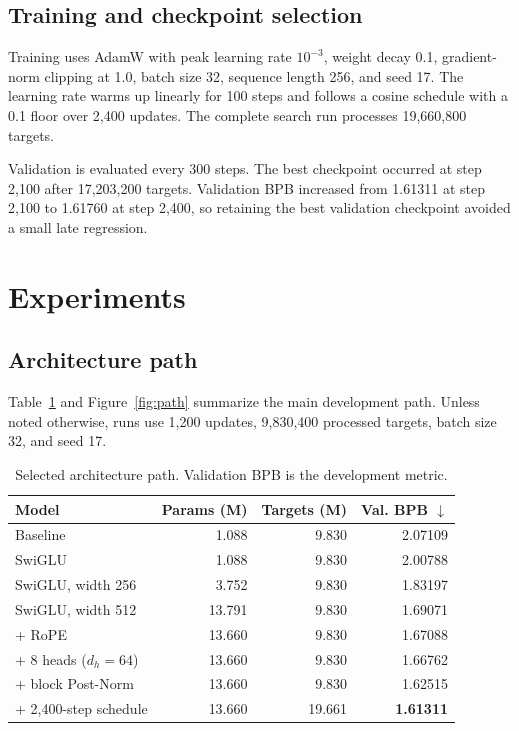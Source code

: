 \documentclass[10pt]{article}
\begin{document}
\subsection{Training and checkpoint selection}

Training uses AdamW with peak learning rate $10^{-3}$, weight decay 0.1, gradient-norm clipping at 1.0, batch size 32, sequence length 256, and seed 17. The learning rate warms up linearly for 100 steps and follows a cosine schedule with a 0.1 floor over 2,400 updates. The complete search run processes 19,660,800 targets.

Validation is evaluated every 300 steps. The best checkpoint occurred at step 2,100 after 17,203,200 targets. Validation BPB increased from 1.61311 at step 2,100 to 1.61760 at step 2,400, so retaining the best validation checkpoint avoided a small late regression.

\section{Experiments}

\subsection{Architecture path}

Table~\ref{tab:path} and Figure~\ref{fig:path} summarize the main development path. Unless noted otherwise, runs use 1,200 updates, 9,830,400 processed targets, batch size 32, and seed 17.

\begin{table}[t]
\centering
\small
\caption{Selected architecture path. Validation BPB is the development metric.}
\label{tab:path}
\begin{tabular}{lrrr}
\toprule
Model & Params (M) & Targets (M) & Val. BPB $\downarrow$\\
\midrule
Baseline & 1.088 & 9.830 & 2.07109\\
SwiGLU & 1.088 & 9.830 & 2.00788\\
SwiGLU, width 256 & 3.752 & 9.830 & 1.83197\\
SwiGLU, width 512 & 13.791 & 9.830 & 1.69071\\
+ RoPE & 13.660 & 9.830 & 1.67088\\
+ 8 heads ($d_h=64$) & 13.660 & 9.830 & 1.66762\\
+ block Post-Norm & 13.660 & 9.830 & 1.62515\\
+ 2,400-step schedule & 13.660 & 19.661 & \textbf{1.61311}\\
\bottomrule
\end{tabular}
\end{table}
\end{document}
